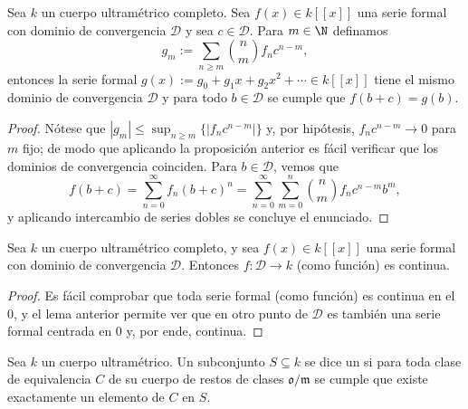\documentclass[teoria-numeros.tex]{subfiles}
\begin{document}
\begin{lem}
	Sea $k$ un cuerpo ultramétrico completo.
	Sea $f(x) \in k[[x]]$ una serie formal con dominio de convergencia $\mathcal{D}$ y sea $c \in \mathcal{D}$.
	Para $m \in \N$ definamos
	\begin{equation}
		g_m := \sum_{n\ge m} \binom{n}{m} f_n c^{n-m},
		\label{eq:formal_ser_shift}
	\end{equation}
	entonces la serie formal $g(x) := g_0 + g_1x + g_2x^2 + \cdots \in k[[x]]$ tiene el mismo dominio de convergencia $\mathcal{D}$
	y para todo $b \in \mathcal{D}$ se cumple que $f(b + c) = g(b)$.
\end{lem}
\begin{proof}
	Nótese que $|g_m| \le \sup_{n\ge m}\{ |f_n c^{n-m}| \}$ y, por hipótesis, $f_n c^{n-m} \to 0$ para $m$ fijo;
	de modo que aplicando la proposición anterior es fácil verificar que los dominios de convergencia coinciden.
	Para $b \in \mathcal{D}$, vemos que
	$$ f(b + c) = \sum_{n=0}^{\infty} f_n(b + c)^n = \sum_{n=0}^{\infty} \sum_{m=0}^{n} \binom{n}{m} f_n c^{n-m} b^m, $$
	y aplicando intercambio de series dobles se concluye el enunciado.
\end{proof}
\begin{cor}
	Sea $k$ un cuerpo ultramétrico completo, y sea $f(x) \in k[[x]]$ una serie formal con dominio de convergencia $\mathcal{D}$.
	Entonces $f\colon \mathcal{D} \to k$ (como función) es continua.
\end{cor}
\begin{proof}
	Es fácil comprobar que toda serie formal (como función) es continua en el 0, y el lema anterior permite ver que en otro punto de $\mathcal{D}$
	es también una serie formal centrada en 0 y, por ende, continua.
\end{proof}

\begin{mydef}
	Sea $k$ un cuerpo ultramétrico.
	Un subconjunto $S \subseteq k$ se dice un  si para toda
	clase de equivalencia $C$ de su cuerpo de restos de clases $\mathfrak{o}/\mathfrak{m}$ se cumple que existe exactamente un elemento de $C$ en $S$.
\end{mydef}
\end{document}

